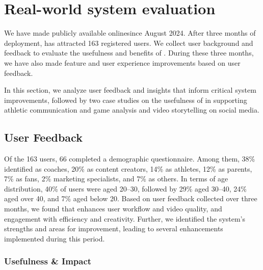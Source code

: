 \section{Real-world system evaluation}
We have made \SB{} publicly available online\footnotemark[1] since August 2024. 
After three months of deployment, \SB{} has attracted 163 registered users. We collect user background and feedback to evaluate the usefulness and benefits of \SB{}. During these three months, we have also made feature and user experience improvements based on user feedback. 

In this section, we analyze user feedback and insights that inform critical system improvements, followed by two case studies on the usefulness of \SB{} in supporting athletic communication and game analysis and video storytelling on social media.

\subsection{User Feedback}


Of the 163 users, 66 completed a demographic questionnaire. Among them, 38\% identified as coaches, 20\% as content creators, 14\% as athletes,  12\% as parents,  7\% as fans, 2\% marketing specialists, 
and 7\% as others. In terms of age distribution, 40\% of users were aged 20–30, followed by 29\% aged 30–40, 24\% aged over 40, and 7\% aged below 20.
Based on user feedback collected over three months, we found that \SB{} enhances user workflow and video quality, and engagement with efficiency and creativity. Further, we identified the system's strengths and areas for improvement, leading to several enhancements implemented during this period.

\subsubsection{Usefulness \& Impact}




